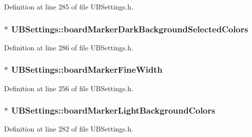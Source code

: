 Definition at line 285 of file U\-B\-Settings.\-h.

\hypertarget{class_u_b_settings_a4b7af9f01a8c26c2089451a7f472fb60}{
\subsubsection[{board\-Marker\-Dark\-Background\-Selected\-Colors}]{$\ast$ U\-B\-Settings\-::board\-Marker\-Dark\-Background\-Selected\-Colors}}\label{db/d66/class_u_b_settings_a4b7af9f01a8c26c2089451a7f472fb60}


Definition at line 286 of file U\-B\-Settings.\-h.

\hypertarget{class_u_b_settings_a0985f0662d9606ddb12d889d401111f7}{
\subsubsection[{board\-Marker\-Fine\-Width}]{$\ast$ U\-B\-Settings\-::board\-Marker\-Fine\-Width}}\label{db/d66/class_u_b_settings_a0985f0662d9606ddb12d889d401111f7}


Definition at line 256 of file U\-B\-Settings.\-h.

\hypertarget{class_u_b_settings_ade781b9fcdd9c51423729bdac51cf242}{
\subsubsection[{board\-Marker\-Light\-Background\-Colors}]{$\ast$ U\-B\-Settings\-::board\-Marker\-Light\-Background\-Colors}}\label{db/d66/class_u_b_settings_ade781b9fcdd9c51423729bdac51cf242}


Definition at line 282 of file U\-B\-Settings.\-h.


